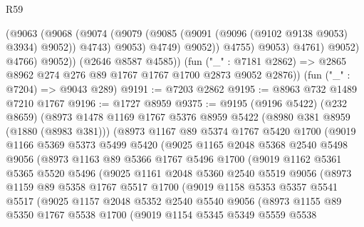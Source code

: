 \begin{lexlean}{R59}
\begin{coremodule}
                        (@9063
                          (@9068
                            (@9074
                              (@9079 (@9085 (@9091 (@9096 (@9102 @9138 @9053) @3934) @9052)) @4743)
                              @9053)
                            @4749)
                          @9052))
                      @4755)
                    @9053)
                  @4761)
                @9052)
              @4766)
            @9052))
        (@2646 @8587 @4585))
      (fun ("_" : @7181 @2862) => @2865 @8962 @274 @276 @89 @1767 @1767 @1700 @2873 @9052 @2876))
    (fun ("_" : @7204) => @9043 @289)
@9191 := @7203 @2862
@9195 := @8963 @732 @1489 @7210 @1767
@9196 := @1727 @8959
@9375 := @9195
    (@9196 @5422)
    (@232 @8659)
    (@8973
      @1478
      @1169
      @1767
      @5376
      @8959
      @5422
      (@8980 @381 @8959 (@1880 (@8983 @381)))
      (@8973
        @1167
        @89
        @5374
        @1767
        @5420
        @1700
        (@9019
          @1166
          @5369
          @5373
          @5499
          @5420
          (@9025
            @1165
            @2048
            @5368
            @2540
            @5498
            @9056
            (@8973
              @1163
              @89
              @5366
              @1767
              @5496
              @1700
              (@9019
                @1162
                @5361
                @5365
                @5520
                @5496
                (@9025
                  @1161
                  @2048
                  @5360
                  @2540
                  @5519
                  @9056
                  (@8973
                    @1159
                    @89
                    @5358
                    @1767
                    @5517
                    @1700
                    (@9019
                      @1158
                      @5353
                      @5357
                      @5541
                      @5517
                      (@9025
                        @1157
                        @2048
                        @5352
                        @2540
                        @5540
                        @9056
                        (@8973
                          @1155
                          @89
                          @5350
                          @1767
                          @5538
                          @1700
                          (@9019
                            @1154
                            @5345
                            @5349
                            @5559
                            @5538

\end{coremodule}
\end{lexlean}
